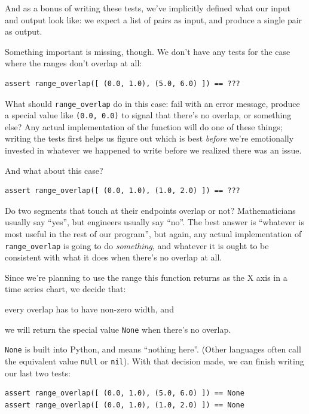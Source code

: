 \documentclass{book}
\begin{document}
And as a bonus of writing these tests, we've implicitly defined what our
input and output look like: we expect a list of pairs as input, and
produce a single pair as output.

Something important is missing, though. We don't have any tests for the
case where the ranges don't overlap at all:

\begin{verbatim}
assert range_overlap([ (0.0, 1.0), (5.0, 6.0) ]) == ???
\end{verbatim}

What should \texttt{range\_overlap} do in this case: fail with an error
message, produce a special value like \texttt{(0.0, 0.0)} to signal that
there's no overlap, or something else? Any actual implementation of the
function will do one of these things; writing the tests first helps us
figure out which is best \emph{before} we're emotionally invested in
whatever we happened to write before we realized there was an issue.

And what about this case?

\begin{verbatim}
assert range_overlap([ (0.0, 1.0), (1.0, 2.0) ]) == ???
\end{verbatim}

Do two segments that touch at their endpoints overlap or not?
Mathematicians usually say ``yes'', but engineers usually say ``no''.
The best answer is ``whatever is most useful in the rest of our
program'', but again, any actual implementation of
\texttt{range\_overlap} is going to do \emph{something}, and whatever it
is ought to be consistent with what it does when there's no overlap at
all.

Since we're planning to use the range this function returns as the X
axis in a time series chart, we decide that:

\begin{swcenumerate}
\item
  every overlap has to have non-zero width, and
\item
  we will return the special value \texttt{None} when there's no
  overlap.
\end{swcenumerate}

\texttt{None} is built into Python, and means ``nothing here''. (Other
languages often call the equivalent value \texttt{null} or
\texttt{nil}). With that decision made, we can finish writing our last
two tests:

\begin{verbatim}
assert range_overlap([ (0.0, 1.0), (5.0, 6.0) ]) == None
assert range_overlap([ (0.0, 1.0), (1.0, 2.0) ]) == None
\end{verbatim}
\end{document}
